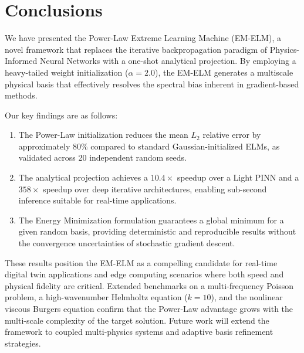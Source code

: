 \documentclass[final,12pt,3p,times,fleqn]{elsarticle}
\begin{document}
\section{Conclusions}

We have presented the Power-Law Extreme Learning Machine (EM-ELM), a novel framework that replaces the iterative backpropagation paradigm of Physics-Informed Neural Networks with a one-shot analytical projection. By employing a heavy-tailed weight initialization ($\alpha=2.0$), the EM-ELM generates a multiscale physical basis that effectively resolves the spectral bias inherent in gradient-based methods.

Our key findings are as follows:
\begin{enumerate}
    \item The Power-Law initialization reduces the mean $L_2$ relative error by approximately $80\%$ compared to standard Gaussian-initialized ELMs, as validated across 20 independent random seeds.
    \item The analytical projection achieves a $10.4\times$ speedup over a Light PINN and a $358\times$ speedup over deep iterative architectures, enabling sub-second inference suitable for real-time applications.
    \item The Energy Minimization formulation guarantees a global minimum for a given random basis, providing deterministic and reproducible results without the convergence uncertainties of stochastic gradient descent.
\end{enumerate}

These results position the EM-ELM as a compelling candidate for real-time digital twin applications and edge computing scenarios where both speed and physical fidelity are critical. Extended benchmarks on a multi-frequency Poisson problem, a high-wavenumber Helmholtz equation ($k=10$), and the nonlinear viscous Burgers equation confirm that the Power-Law advantage grows with the multi-scale complexity of the target solution. Future work will extend the framework to coupled multi-physics systems and adaptive basis refinement strategies.



\end{document}
